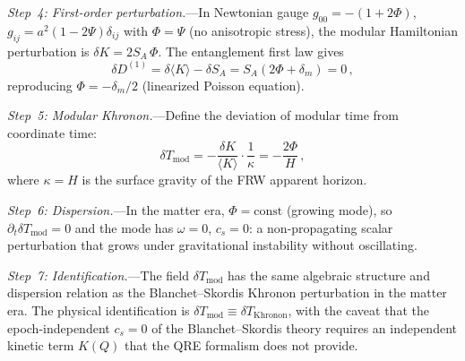 \documentclass[prd,twocolumn,superscriptaddress,longbibliography,floatfix]{revtex4-2}
\newcommand{\Tmod}{T_{\mathrm{mod}}}
\begin{document}
\emph{Step~4: First-order perturbation.}---In
Newtonian gauge
$g_{00} = -(1+2\Phi)$,
$g_{ij} = a^2(1-2\Psi)\delta_{ij}$
with $\Phi = \Psi$ (no anisotropic stress), the
modular Hamiltonian perturbation is
$\delta K = 2S_A\,\Phi$.
The entanglement first law gives
\begin{equation}
\delta D^{(1)} = \delta\langle K\rangle - \delta S_A
= S_A(2\Phi + \delta_m) = 0\,,
\end{equation}
reproducing $\Phi = -\delta_m/2$ (linearized
Poisson equation).

\emph{Step~5: Modular Khronon.}---Define the
deviation of modular time from coordinate time:
\begin{equation}
\delta\Tmod = -\frac{\delta K}{\langle K\rangle}
\cdot\frac{1}{\kappa}
= -\frac{2\Phi}{H}\,,
\end{equation}
where $\kappa = H$ is the surface gravity of
the FRW apparent horizon.

\emph{Step~6: Dispersion.}---In the matter era,
$\Phi = \mathrm{const}$ (growing mode), so
$\partial_t\delta\Tmod = 0$ and the mode has
$\omega = 0$, $c_s = 0$: a non-propagating
scalar perturbation that grows under gravitational
instability without oscillating.

\emph{Step~7: Identification.}---The field
$\delta\Tmod$ has the same algebraic structure and
dispersion relation as the Blanchet--Skordis
Khronon perturbation in the matter era.  The
physical identification is
$\delta\Tmod \equiv \delta T_{\mathrm{Khronon}}$,
with the caveat that the epoch-independent
$c_s = 0$ of the Blanchet--Skordis theory
requires an independent kinetic term $K(Q)$ that
the QRE formalism does not provide.
\end{document}
